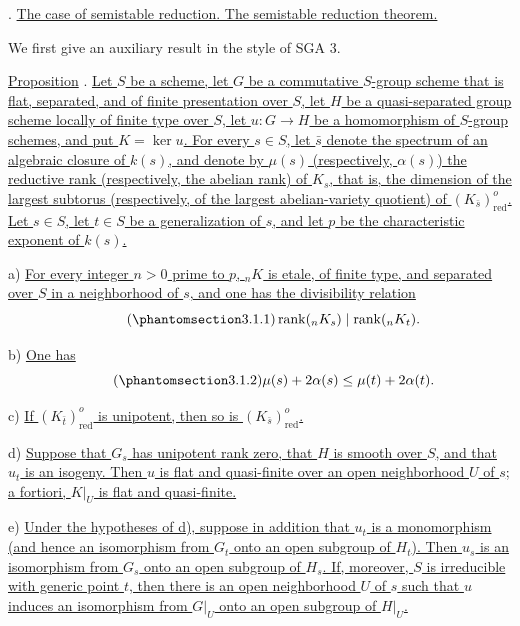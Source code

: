 
\medskip
{}. \underline{The case of semistable reduction.  The semistable reduction
theorem.}

We first give an auxiliary result in the style of SGA 3.

\medskip
\noindent
\underline{Proposition} . \underline{Let $S$ be a scheme, let $G$ be a
commutative $S$-group scheme that is flat, separated, and of finite
presentation over $S$, let $H$ be a quasi-separated group scheme locally of
finite type over $S$, let $u:G\longrightarrow H$ be a homomorphism of
$S$-group schemes, and put $K=\ker u$.  For every $s\in S$, let $\bar s$
denote the spectrum of an algebraic closure of $k(s)$, and denote by
$\mu(s)$ (respectively, $\alpha(s)$) the reductive rank (respectively, the
abelian rank) of $K_s$, that is, the dimension of the largest subtorus
(respectively, of the largest abelian-variety quotient) of
$(K_{\bar s})^o_{\mathrm{red}}$.  Let $s\in S$, let $t\in S$ be a
generalization of $s$, and let $p$ be the characteristic exponent of
$k(s)$.}

\smallskip
\noindent
a) \underline{For every integer $n>0$ prime to $p$, ${}_nK$ is etale, of
finite type, and separated over $S$ in a neighborhood of $s$, and one has
the divisibility relation}
\begin{equation}\tag{\SGARefTarget{sga7.sga7i.eix.n3-1-1}{3.1.1}}
 \operatorname{rank}({}_nK_s)\mid \operatorname{rank}({}_nK_t).
\end{equation}

\noindent
b) \underline{One has}
\begin{equation}\tag{\SGARefTarget{sga7.sga7i.eix.n3-1-2}{3.1.2}}
 \mu(s)+2\alpha(s)\leq \mu(t)+2\alpha(t).
\end{equation}

\noindent
c) \underline{If $(K_{\bar t})^o_{\mathrm{red}}$ is unipotent, then so is
$(K_{\bar s})^o_{\mathrm{red}}$.}

\smallskip
\noindent
d) \underline{Suppose that $G_s$ has unipotent rank zero, that $H$ is smooth
over $S$, and that $u_t$ is an isogeny.  Then $u$ is flat and quasi-finite
over an open neighborhood $U$ of $s$; a fortiori, $K|_U$ is flat and
quasi-finite.}

\smallskip
\noindent
e) \underline{Under the hypotheses of d), suppose in addition that $u_t$ is
a monomorphism (and hence an isomorphism from $G_t$ onto an open subgroup of
$H_t$).  Then $u_s$ is an isomorphism from $G_s$ onto an open subgroup of
$H_s$.  If, moreover, $S$ is irreducible with generic point $t$, then there
is an open neighborhood $U$ of $s$ such that $u$ induces an isomorphism from
$G|_U$ onto an open subgroup of $H|_U$.}

